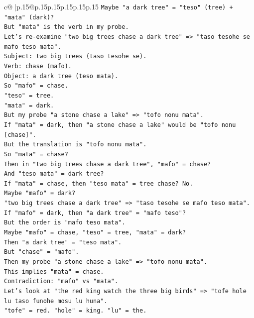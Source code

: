 \documentclass{article}
\begin{document}
{\begin{supertabular}{c@{$\;$}|p{.15\linewidth}@{}p{.15\linewidth}p{.15\linewidth}p{.15\linewidth}p{.15\linewidth}p{.15\linewidth}}
{{{\texttt{Maybe "a dark tree" = "teso" (tree) + "mata" (dark)?} \\
\texttt{But "mata" is the verb in my probe.} \\
\texttt{Let's re{-}examine "two big trees chase a dark tree" => "taso tesohe se mafo teso mata".} \\
\texttt{Subject: two big trees (taso tesohe se).} \\
\texttt{Verb: chase (mafo).} \\
\texttt{Object: a dark tree (teso mata).} \\
\texttt{So "mafo" = chase.} \\
\texttt{"teso" = tree.} \\
\texttt{"mata" = dark.} \\
\texttt{But my probe "a stone chase a lake" => "tofo nonu mata".} \\
\texttt{If "mata" = dark, then "a stone chase a lake" would be "tofo nonu {[}chase{]}".} \\
\texttt{But the translation is "tofo nonu mata".} \\
\texttt{So "mata" = chase?} \\
\texttt{Then in "two big trees chase a dark tree", "mafo" = chase?} \\
\texttt{And "teso mata" = dark tree?} \\
\texttt{If "mata" = chase, then "teso mata" = tree chase? No.} \\
\texttt{Maybe "mafo" = dark?} \\
\texttt{"two big trees chase a dark tree" => "taso tesohe se mafo teso mata".} \\
\texttt{If "mafo" = dark, then "a dark tree" = "mafo teso"?} \\
\texttt{But the order is "mafo teso mata".} \\
\texttt{Maybe "mafo" = chase, "teso" = tree, "mata" = dark?} \\
\texttt{Then "a dark tree" = "teso mata".} \\
\texttt{But "chase" = "mafo".} \\
\texttt{Then my probe "a stone chase a lake" => "tofo nonu mata".} \\
\texttt{This implies "mata" = chase.} \\
\texttt{Contradiction: "mafo" vs "mata".} \\
\texttt{Let's look at "the red king watch the three big birds" => "tofe hole lu taso funohe mosu lu huna".} \\
\texttt{"tofe" = red. "hole" = king. "lu" = the.} \\
}}}
\end{supertabular}}
\end{document}
